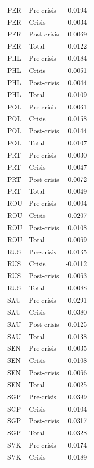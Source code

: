 \begin{longtable}[t]{llr}
PER & Pre-crisis & 0.0194\\
\addlinespace
PER & Crisis & 0.0034\\
PER & Post-crisis & 0.0069\\
PER & Total & 0.0122\\
PHL & Pre-crisis & 0.0184\\
PHL & Crisis & 0.0051\\
\addlinespace
PHL & Post-crisis & 0.0044\\
PHL & Total & 0.0109\\
POL & Pre-crisis & 0.0061\\
POL & Crisis & 0.0158\\
POL & Post-crisis & 0.0144\\
\addlinespace
POL & Total & 0.0107\\
PRT & Pre-crisis & 0.0030\\
PRT & Crisis & 0.0047\\
PRT & Post-crisis & 0.0072\\
PRT & Total & 0.0049\\
\addlinespace
ROU & Pre-crisis & -0.0004\\
ROU & Crisis & 0.0207\\
ROU & Post-crisis & 0.0108\\
ROU & Total & 0.0069\\
RUS & Pre-crisis & 0.0165\\
\addlinespace
RUS & Crisis & -0.0112\\
RUS & Post-crisis & 0.0063\\
RUS & Total & 0.0088\\
SAU & Pre-crisis & 0.0291\\
SAU & Crisis & -0.0380\\
\addlinespace
SAU & Post-crisis & 0.0125\\
SAU & Total & 0.0138\\
SEN & Pre-crisis & -0.0035\\
SEN & Crisis & 0.0108\\
SEN & Post-crisis & 0.0066\\
\addlinespace
SEN & Total & 0.0025\\
SGP & Pre-crisis & 0.0399\\
SGP & Crisis & 0.0104\\
SGP & Post-crisis & 0.0317\\
SGP & Total & 0.0328\\
\addlinespace
SVK & Pre-crisis & 0.0174\\
SVK & Crisis & 0.0189\\

\end{longtable}
